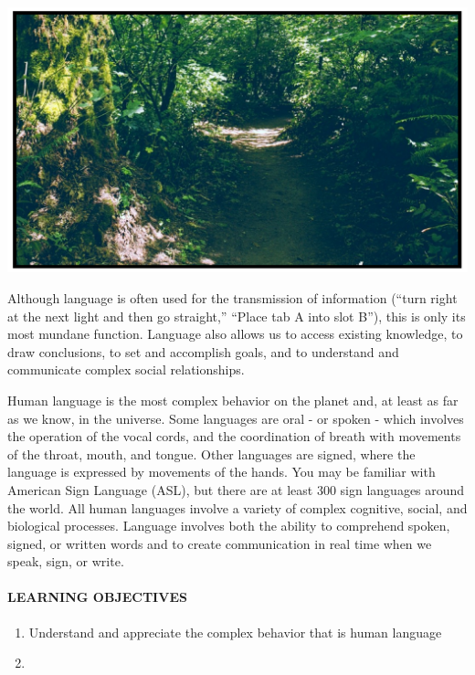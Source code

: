 \documentclass[
]{krantz}
\providecommand{\tightlist}{%
  \setlength{\itemsep}{0pt}\setlength{\parskip}{0pt}}
\begin{document}
\begin{center}\includegraphics[width=1\linewidth]{images/ch8/fig1} \end{center}

Although language is often used for the transmission of information (``turn right at the next light and then go straight,'' ``Place tab A into slot B''), this is only its most mundane function. Language also allows us to access existing knowledge, to draw conclusions, to set and accomplish goals, and to understand and communicate complex social relationships.

Human language is the most complex behavior on the planet and, at least as far as we know, in the universe. Some languages are oral - or spoken - which involves the operation of the vocal cords, and the coordination of breath with movements of the throat, mouth, and tongue. Other languages are signed, where the language is expressed by movements of the hands. You may be familiar with American Sign Language (ASL), but there are at least 300 sign languages around the world. All human languages involve a variety of complex cognitive, social, and biological processes. Language involves both the ability to comprehend spoken, signed, or written words and to create communication in real time when we speak, sign, or write.

\hypertarget{learning-objectives-7}{%
\paragraph*{LEARNING OBJECTIVES}\label{learning-objectives-7}}

\begin{enumerate}
\def\labelenumi{\arabic{enumi}.}
\tightlist
\item
  Understand and appreciate the complex behavior that is human language
\item
\end{enumerate}
\end{document}

